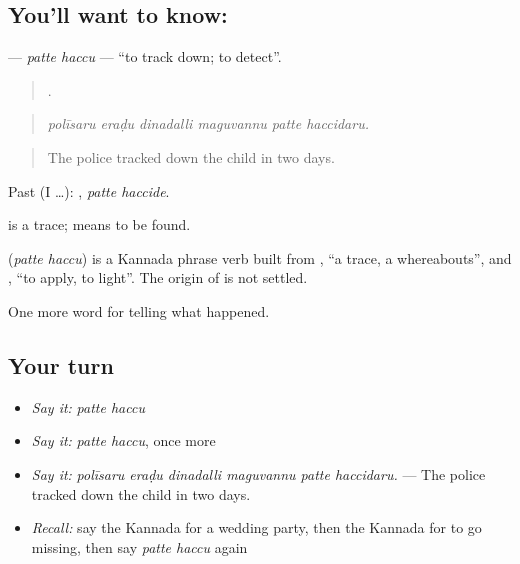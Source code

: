 \subsection*{You'll want to know:  }
\textbf{ } — \emph{patte haccu} — \textquotedblleft{}to track down; to detect\textquotedblright{}.

\begin{quote}
     .
\end{quote}

\begin{quote}
\emph{polīsaru eraḍu dinadalli maguvannu patte haccidaru.}
\end{quote}

\begin{quote}
The police tracked down the child in two days.
\end{quote}

Past (I …):  , \emph{patte haccide}.

 is a trace;  means to be found.

\begin{cousinweb}
\textbf{ } (\emph{patte haccu}) is a Kannada phrase verb built from , \textquotedblleft{}a trace, a whereabouts\textquotedblright{}, and , \textquotedblleft{}to apply, to light\textquotedblright{}. The origin of  is not settled.
\end{cousinweb}

\begin{grammarlens}[title={What you've built}]
One more word for telling what happened.
\end{grammarlens}

\subsection*{Your turn}
\begin{itemize}
\raggedright
  \item \emph{Say it:} \emph{patte haccu}
  \item \emph{Say it:} \emph{patte haccu}, once more
  \item \emph{Say it:} \emph{polīsaru eraḍu dinadalli maguvannu patte haccidaru.} — The police tracked down the child in two days.
  \item \emph{Recall:} say the Kannada for a wedding party, then the Kannada for to go missing, then say \emph{patte haccu} again
\end{itemize}

